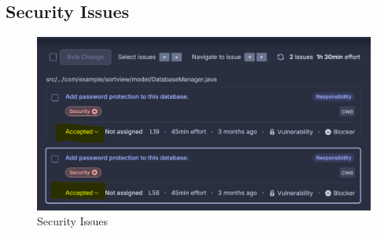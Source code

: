 \documentclass[12pt,a4paper]{article}
\begin{document}
\subsection{Security Issues}
\begin{figure}[H]
    \centering
    \includegraphics[width=1\textwidth]{Security Issues.png}
    \caption{Security Issues}
    \label{fig:SI}
\end{figure}
\end{document}
